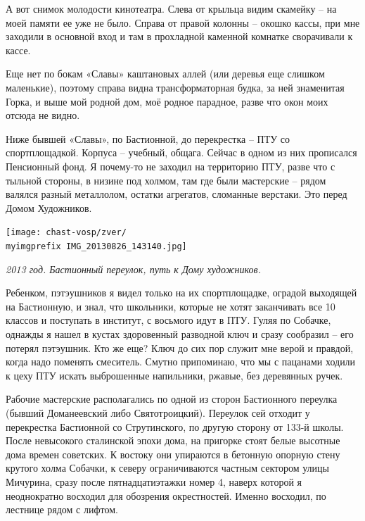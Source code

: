 А вот снимок молодости кинотеатра. Слева от крыльца видим скамейку – на моей памяти ее уже не было. Справа от правой колонны – окошко кассы, при мне заходили в основной вход и там в прохладной каменной комнатке сворачивали к кассе.

Еще нет по бокам «Славы» каштановых аллей (или деревья еще слишком маленькие), поэтому справа видна трансформаторная будка, за ней знаменитая Горка, и выше мой родной дом, моё родное парадное, разве что окон моих отсюда не видно.

\vspace*{\fill}

\newpage


Ниже бывшей «Славы», по Бастионной, до перекрестка – ПТУ со спортплощадкой. Корпуса – учебный, общага. Сейчас в одном из них прописался Пенсионный фонд. Я почему-то не заходил на территорию ПТУ, разве что с тыльной стороны, в низине под холмом, там где были мастерские – рядом валялся разный металлолом, остатки агрегатов, сломанные верстаки. Это перед Домом Художников.

\begin{center}
\texttt{[image: chast-vosp/zver/\\myimgprefix IMG\_20130826\_143140.jpg]}

\textit{2013 год. Бастионный переулок, путь к Дому художников.}
\end{center}

Ребенком, пэтэушников я видел только на их спортплощадке, оградой выходящей на Бастионную, и знал, что школьники, которые не хотят заканчивать все 10 классов и поступать в институт, с восьмого идут в ПТУ. Гуляя по Собачке, однажды я нашел в кустах здоровенный разводной ключ и сразу сообразил – его потерял пэтэушник. Кто же еще? Ключ до сих пор служит мне верой и правдой, когда надо поменять смеситель. Смутно припоминаю, что мы с пацанами ходили к цеху ПТУ искать выброшенные напильники, ржавые, без деревянных ручек.

Рабочие мастерские располагались по одной из сторон Бастионного переулка (бывший Доманеевский либо Святотроицкий). Переулок сей отходит у перекрестка Бастионной со Струтинского, по другую сторону от 133-й школы. После невысокого сталинской эпохи дома, на пригорке стоят белые высотные дома времен советских. К востоку они упираются в бетонную опорную стену крутого холма Собачки, к северу ограничиваются частным сектором улицы Мичурина, сразу после пятнадцатиэтажки номер 4, наверх которой я неоднократно восходил для обозрения окрестностей. Именно восходил, по лестнице рядом с лифтом.

